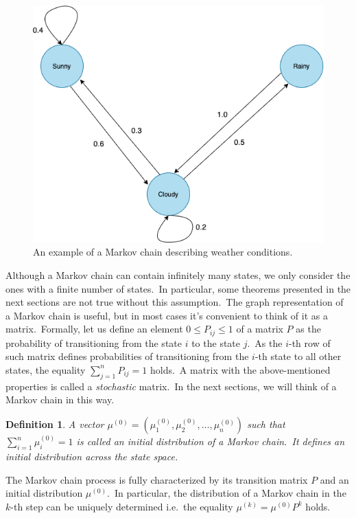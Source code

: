 \documentclass[shortabstract, english, lic]{iithesis}
\theoremstyle{default_theorem_style}\newtheorem{theorem}{Theorem}
\theoremstyle{default_theorem_style}\newtheorem{definition}{Definition}
\begin{document}
\begin{figure}[H]
\centering
\includegraphics[scale=0.43]{markov_chain}
\caption{An example of a Markov chain describing weather conditions.}
\label{fig:markov_chain}
\end{figure}

\noindent Although a Markov chain can contain infinitely many states, we only consider
the ones with a finite number of states.\ In particular, some theorems presented in the next sections
are not true without this assumption.\ The graph representation of a Markov chain is useful, but in most cases
it's convenient to think of it as a matrix.\ Formally, let us define an element $0 \leq P_{ij} \leq 1$ of a matrix
$P$ as the probability of transitioning from the state $i$ to the state $j$.\ As the $i$-th row of such matrix
defines probabilities of transitioning from the $i$-th  state to all other states, the equality
$\sum_{j = 1}^{n} P_{ij} = 1$ holds.\ A matrix with the above-mentioned properties is called a
\textit{stochastic} matrix.\ In the next sections, we will think of a Markov chain in this way.

\begin{definition}
A vector $\mu^{(0)} = (\mu^{(0)}_1, \mu^{(0)}_2, \dots, \mu^{(0)}_n)$ such that $\sum_{i=1}^{n} \mu^{(0)}_i = 1$
is called an \textit{initial distribution} of a Markov chain.\ It defines an initial distribution across the state space.

\end{definition}

\noindent The Markov chain process is fully characterized by its transition matrix $P$ and an initial
distribution $\mu^{(0)}$.\ In particular, the distribution of a Markov chain in the $k$-th step can be uniquely
determined i.e.\ the equality $\mu^{(k)} = \mu^{(0)}P^k$ holds.
\end{document}
